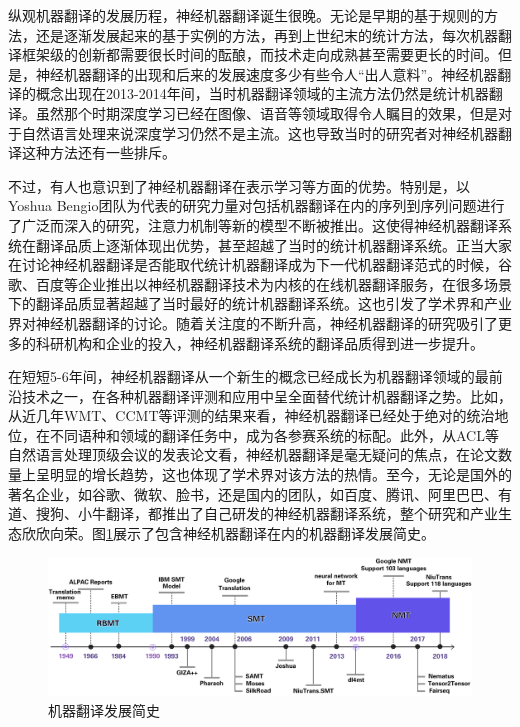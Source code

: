 \parinterval 纵观机器翻译的发展历程，神经机器翻译诞生很晚。无论是早期的基于规则的方法，还是逐渐发展起来的基于实例的方法，再到上世纪末的统计方法，每次机器翻译框架级的创新都需要很长时间的酝酿，而技术走向成熟甚至需要更长的时间。但是，神经机器翻译的出现和后来的发展速度多少有些令人``出人意料''。神经机器翻译的概念出现在2013-2014年间，当时机器翻译领域的主流方法仍然是统计机器翻译。虽然那个时期深度学习已经在图像、语音等领域取得令人瞩目的效果，但是对于自然语言处理来说深度学习仍然不是主流。这也导致当时的研究者对神经机器翻译这种方法还有一些排斥。

\parinterval 不过，有人也意识到了神经机器翻译在表示学习等方面的优势。特别是，以Yoshua Bengio团队为代表的研究力量对包括机器翻译在内的序列到序列问题进行了广泛而深入的研究，注意力机制等新的模型不断被推出。这使得神经机器翻译系统在翻译品质上逐渐体现出优势，甚至超越了当时的统计机器翻译系统。正当大家在讨论神经机器翻译是否能取代统计机器翻译成为下一代机器翻译范式的时候，谷歌、百度等企业推出以神经机器翻译技术为内核的在线机器翻译服务，在很多场景下的翻译品质显著超越了当时最好的统计机器翻译系统。这也引发了学术界和产业界对神经机器翻译的讨论。随着关注度的不断升高，神经机器翻译的研究吸引了更多的科研机构和企业的投入，神经机器翻译系统的翻译品质得到进一步提升。

\parinterval 在短短5-6年间，神经机器翻译从一个新生的概念已经成长为机器翻译领域的最前沿技术之一，在各种机器翻译评测和应用中呈全面替代统计机器翻译之势。比如，从近几年WMT、CCMT等评测的结果来看，神经机器翻译已经处于绝对的统治地位，在不同语种和领域的翻译任务中，成为各参赛系统的标配。此外，从ACL等自然语言处理顶级会议的发表论文看，神经机器翻译是毫无疑问的焦点，在论文数量上呈明显的增长趋势，这也体现了学术界对该方法的热情。至今，无论是国外的著名企业，如谷歌、微软、脸书，还是国内的团队，如百度、腾讯、阿里巴巴、有道、搜狗、小牛翻译，都推出了自己研发的神经机器翻译系统，整个研究和产业生态欣欣向荣。图\ref{fig:6-1}展示了包含神经机器翻译在内的机器翻译发展简史。

\begin{figure}[htp]
\centering
\includegraphics[scale=0.36]{./Chapter6/Figures/mt-history.png}
\caption{机器翻译发展简史}
\label{fig:6-1}
\end{figure}

